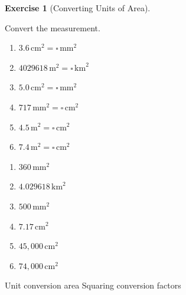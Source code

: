 \documentclass[
  letterpaper,
  DIV=11,
  numbers=noendperiod]{scrreprt}
\theoremstyle{definition}
\newtheorem{exercise}{Exercise}[chapter]
\theoremstyle{remark}
\begin{document}
\begin{exercise}[Converting Units of
Area]\protect\hypertarget{exr-conv-2}{}\label{exr-conv-2}

Convert the measurement.

\begin{enumerate}
\def\labelenumi{\alph{enumi})}
\item
  \(3.6\,\text{cm}^{2} = \square\,\text{mm}^{2}\)
\item
  \(4029618\,\text{m}^{2} = \square\,\text{km}^{2}\)
\item
  \(5.0\,\text{cm}^{2} = \square\,\text{mm}^{2}\)
\item
  \(717\,\text{mm}^{2} = \square\,\text{cm}^{2}\)
\item
  \(4.5\,\text{m}^{2} = \square\,\text{cm}^{2}\)
\item
  \(7.4\,\text{m}^{2} = \square\,\text{cm}^{2}\)
\end{enumerate}

\begin{tcolorbox}[enhanced jigsaw, opacitybacktitle=0.6, coltitle=black, arc=.35mm, colframe=quarto-callout-tip-color-frame, colback=white, bottomrule=.15mm, left=2mm, colbacktitle=quarto-callout-tip-color!10!white, titlerule=0mm, opacityback=0, title=\textcolor{quarto-callout-tip-color}{\faLightbulb}\hspace{0.5em}{🔍 View Solution}, leftrule=.75mm, breakable, rightrule=.15mm, bottomtitle=1mm, toptitle=1mm, toprule=.15mm]

\begin{enumerate}
\def\labelenumi{\alph{enumi})}
\item
  \(360\,\text{mm}^{2}\)
\item
  \(4.029618\,\text{km}^{2}\)
\item
  \(500\,\text{mm}^{2}\)
\item
  \(7.17\,\text{cm}^{2}\)
\item
  \(45{,}000\,\text{cm}^{2}\)
\item
  \(74{,}000\,\text{cm}^{2}\)
\end{enumerate}

\end{tcolorbox}

{Unit conversion area} {Squaring conversion factors}

\end{exercise}
\end{document}
